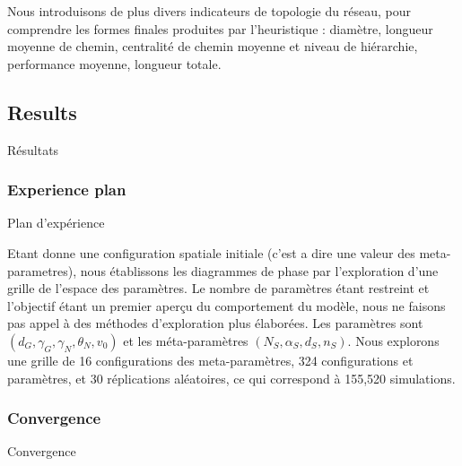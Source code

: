 Nous introduisons de plus divers indicateurs de topologie du réseau, pour comprendre les formes finales produites par l'heuristique : diamètre, longueur moyenne de chemin, centralité de chemin moyenne et niveau de hiérarchie, performance moyenne, longueur totale.




\subsection{Results}{Résultats}


\subsubsection{Experience plan}{Plan d'expérience}

Etant donne une configuration spatiale initiale (c'est a dire une valeur des meta-parametres), nous établissons les diagrammes de phase par l'exploration d'une grille de l'espace des paramètres. Le nombre de paramètres étant restreint et l'objectif étant un premier aperçu du comportement du modèle, nous ne faisons pas appel à des méthodes d'exploration plus élaborées. Les paramètres sont $(d_G,\gamma_G,\gamma_N,\theta_N,v_0)$ et les méta-paramètres $(N_S,\alpha_S,d_S,n_S)$. Nous explorons une grille de 16 configurations des meta-paramètres, 324 configurations et paramètres, et 30 réplications aléatoires, ce qui correspond à 155,520 simulations.



\subsubsection{Convergence}{Convergence}


